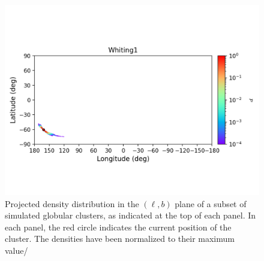 \begin{figure}
\begin{center}
                \includegraphics[clip=true, trim = 0mm 20mm 0mm 10mm, width=1\columnwidth]{images/error_plots_Whiting1.png}
            \end{center}
            \caption[]{Projected density distribution in the $(\ell, b)$ plane of a subset of simulated globular clusters, as indicated at the top of each panel. In each panel, the red circle indicates the current position of the cluster. The densities have been normalized to their maximum value/}\label{stream20}
        \end{figure}
    
    \onecolumn
